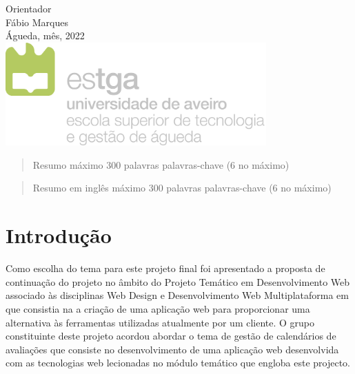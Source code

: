 \documentclass[12pt, twoside]{report}
\begin{document}
\begin{titlepage}
		\vspace{1cm}
		Orientador\\
		Fábio Marques\\
		
		\vspace{3cm}
		\large
		Águeda, mês, 2022 \\
		
		\vspace{2cm}
		\centering
		\includegraphics[width=10cm]{image/AssB_vertical_cor}
		
	\end{titlepage}

	\begin{abstract}
	\setlength{\parskip}{14pt}
	\setlength{\parindent}{0pt}
	
	
	Resumo máximo 300 palavras
	palavras-chave (6 no máximo)
	\end{abstract}
	
	\begin{abstract}
		Resumo em inglês máximo 300 palavras
		palavras-chave (6 no máximo)
	\end{abstract}

	\newpage
	\setcounter{page}{1} %
	\tableofcontents %
	\thispagestyle{plain} %
	\thispagestyle{empty} %
	\newpage
	\listoftables %
	\newpage
	\listoffigures %
	
	
	\newpage
	

	\chapter{Introdução}
	\setlength{\parskip}{14pt}
	\setlength{\parindent}{0pt}
	
	Como escolha do tema para este projeto final foi apresentado a proposta de continuação do projeto no âmbito do Projeto Temático em Desenvolvimento Web associado às disciplinas Web Design e
	Desenvolvimento Web Multiplataforma em que consistia na a criação de uma aplicação web para proporcionar uma alternativa às ferramentas utilizadas atualmente por um cliente. O grupo constituinte deste projeto acordou abordar o tema de gestão de calendários de avaliações que consiste no desenvolvimento de uma aplicação web desenvolvida com as tecnologias web lecionadas no módulo temático
	que engloba este projecto. 
	
\end{document}
